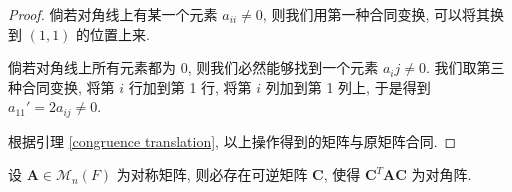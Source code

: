 \documentclass[UTF8]{book}
\begin{document}
\begin{proof}
    倘若对角线上有某一个元素 $a_{ii} \neq 0$, 则我们用第一种合同变换, 
    可以将其换到 $(1,1)$ 的位置上来. 

    倘若对角线上所有元素都为 0, 则我们必然能够找到一个元素 $a_ij\neq 0$. 
    我们取第三种合同变换, 将第 $i$ 行加到第 1 行, 将第 $i$ 列加到第 1 列上, 
    于是得到 $a_{11}' = 2a_{ij} \neq 0$. 
    
    根据引理 \ref{congruence translation}, 以上操作得到的矩阵与原矩阵合同. 
\end{proof}

\begin{theorem} \label{Thm congruence}
    设 $\boldsymbol{A}\in \mathcal{M}_n(F)$ 为对称矩阵, 
    则必存在可逆矩阵 $\boldsymbol{C}$, 使得 
    $\boldsymbol{C}^T\boldsymbol{A}\boldsymbol{C}$ 为对角阵.
\end{theorem}
\end{document}

